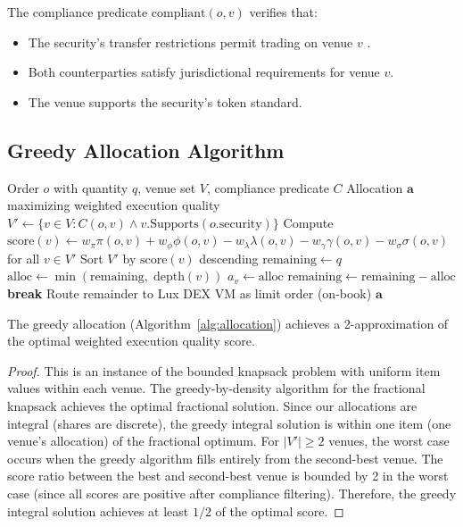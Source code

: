 The compliance predicate $\text{compliant}(o, v)$ verifies that:
\begin{itemize}[nosep]
  \item The security's transfer restrictions permit trading on venue $v$ \cite{lux-security-token-standard}.
  \item Both counterparties satisfy jurisdictional requirements for venue $v$.
  \item The venue supports the security's token standard.
\end{itemize}

\subsection{Greedy Allocation Algorithm}

\begin{algorithm}[H]
\caption{Greedy order allocation across venues.}
\label{alg:allocation}
\begin{algorithmic}[1]
\Require Order $o$ with quantity $q$, venue set $V$, compliance predicate $C$
\Ensure Allocation $\mathbf{a}$ maximizing weighted execution quality
\State $V' \gets \{v \in V : C(o, v) \land v.\text{Supports}(o.\text{security})\}$
\State Compute $\text{score}(v) \gets w_\pi \pi(o,v) + w_\phi \phi(o,v) - w_\lambda \lambda(o,v) - w_\gamma \gamma(o,v) - w_\sigma \sigma(o,v)$ for all $v \in V'$
\State Sort $V'$ by $\text{score}(v)$ descending
\State $\text{remaining} \gets q$
  \State $\text{alloc} \gets \min(\text{remaining},\; \text{depth}(v))$
  \State $a_v \gets \text{alloc}$
  \State $\text{remaining} \gets \text{remaining} - \text{alloc}$
    \State \textbf{break}
  \EndIf
\EndFor
{}
  \State Route remainder to Lux DEX VM as limit order (on-book)
\EndIf
\State \Return $\mathbf{a}$
\end{algorithmic}
\end{algorithm}

\begin{theorem}
The greedy allocation (Algorithm~\ref{alg:allocation}) achieves a 2-approximation of the optimal weighted execution quality score.
\end{theorem}

\begin{proof}
This is an instance of the bounded knapsack problem with uniform item values within each venue. The greedy-by-density algorithm for the fractional knapsack achieves the optimal fractional solution. Since our allocations are integral (shares are discrete), the greedy integral solution is within one item (one venue's allocation) of the fractional optimum. For $|V'| \geq 2$ venues, the worst case occurs when the greedy algorithm fills entirely from the second-best venue. The score ratio between the best and second-best venue is bounded by 2 in the worst case (since all scores are positive after compliance filtering). Therefore, the greedy integral solution achieves at least $1/2$ of the optimal score.
\end{proof}

